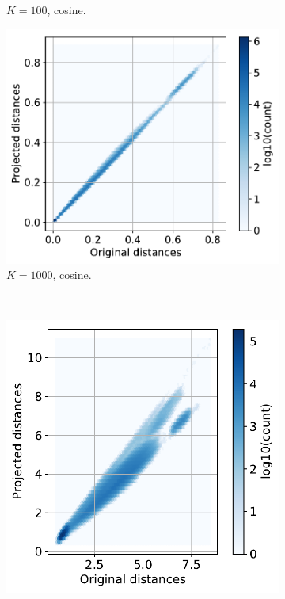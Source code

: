 \documentclass[11pt,onecolumn]{article}
\begin{document}
\begin{figure}[h!]
\begin{subfigure}[t]{0.29\textwidth}
				\caption{$K=100$, cosine.}
		\end{subfigure}
		\hfill
		\begin{subfigure}[t]{0.29\textwidth}
				\centering
				\includegraphics[width=\linewidth]{fig/sparse_projection_cosine_k1000.pdf}
				\caption{$K=1000$, cosine.}
		\end{subfigure}\\
		\begin{subfigure}[t]{0.29\textwidth}
				\centering
				\includegraphics[width=\linewidth]{fig/sparse_projection_euclidean_k50.pdf}

\end{subfigure}
\end{figure}
\end{document}
